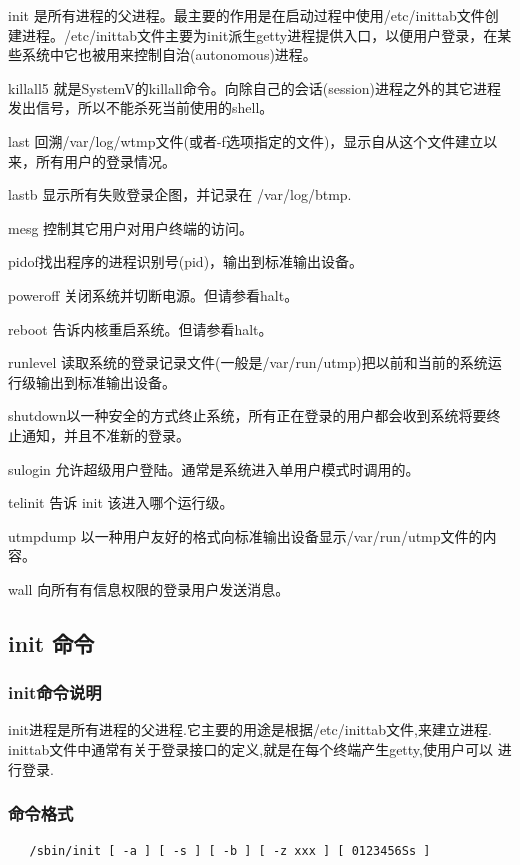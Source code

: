 init
是所有进程的父进程。最主要的作用是在启动过程中使用/etc/inittab文件创建进程。/etc/inittab文件主要为init派生getty进程提供入口，以便用户登录，在某些系统中它也被用来控制自治(autonomous)进程。

killall5
就是SystemV的killall命令。向除自己的会话(session)进程之外的其它进程发出信号，所以不能杀死当前使用的shell。

last
回溯/var/log/wtmp文件(或者-f选项指定的文件)，显示自从这个文件建立以来，所有用户的登录情况。

lastb 显示所有失败登录企图，并记录在 /var/log/btmp.

mesg 控制其它用户对用户终端的访问。

pidof找出程序的进程识别号(pid)，输出到标准输出设备。

poweroff 关闭系统并切断电源。但请参看halt。

reboot 告诉内核重启系统。但请参看halt。

runlevel
读取系统的登录记录文件(一般是/var/run/utmp)把以前和当前的系统运行级输出到标准输出设备。

shutdown以一种安全的方式终止系统，所有正在登录的用户都会收到系统将要终止通知，并且不准新的登录。

sulogin 允许超级用户登陆。通常是系统进入单用户模式时调用的。

telinit 告诉 init 该进入哪个运行级。

utmpdump 以一种用户友好的格式向标准输出设备显示/var/run/utmp文件的内容。

wall 向所有有信息权限的登录用户发送消息。

\subsection{init 命令}

\subsubsection{init命令说明}

init进程是所有进程的父进程.它主要的用途是根据/etc/inittab文件,来建立进程.
inittab文件中通常有关于登录接口的定义,就是在每个终端产生getty,使用户可以
进行登录.

\subsubsection{命令格式}

{\begin{shaded}\begin{verbatim}
   /sbin/init [ -a ] [ -s ] [ -b ] [ -z xxx ] [ 0123456Ss ]
\end{verbatim}\end{shaded}}
